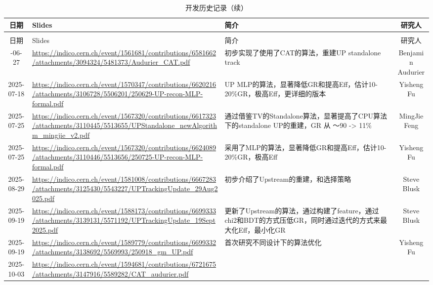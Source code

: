 \documentclass[UTF8]{article}
\begin{document}
\renewcommand{\arraystretch}{1.6}
\begin{longtable}{c>{\centering\arraybackslash}m{4cm}m{6cm}c}
    \caption{开发历史记录}
    \label{tab:research-done} \\
    \toprule
    日期 & Slides & 简介 & 研究人 \\
    \midrule
    \endfirsthead
    \caption{开发历史记录（续）} \\
    \toprule
    日期 & Slides & 简介 & 研究人 \\
    \midrule
    \endhead
    \bottomrule
    \endfoot
    2025-06-27 & \tiny\url{https://indico.cern.ch/event/1561681/contributions/6581662/attachments/3094324/5481373/Audurier_CAT.pdf}
        & 初步实现了使用了CAT的算法，重建UP standalone track
        & Benjamin Audurier \\
    2025-07-18 & \tiny\url{https://indico.cern.ch/event/1570347/contributions/6620216/attachments/3106728/5506201/250629-UP-recon-MLP-formal.pdf}
        & UP MLP的算法，显著降低GR和提高Eff，估计10-20\%GR，极高Eff，更详细的版本
        & Yisheng Fu \\
    2025-07-25 & \tiny\url{https://indico.cern.ch/event/1567320/contributions/6617323/attachments/3110445/5513655/UPStandalone_newAlgorithm_mingjie_v2.pdf}
        & 通过借鉴TV的Standalone算法，显著提高了CPU算法下的standalone UP的重建，GR 从 ～90 -> 11\%
        & MingJie Feng \\
    2025-07-25 & \tiny\url{https://indico.cern.ch/event/1567320/contributions/6624089/attachments/3110446/5513656/250725-UP-recon-MLP-formal.pdf}
        & 采用了MLP的算法，显著降低GR和提高Eff，估计10-20\%GR，极高Eff
        & Yisheng Fu \\
    2025-08-29 & \tiny\url{https://indico.cern.ch/event/1581008/contributions/6667283/attachments/3125430/5543227/UPTrackingUpdate_29Aug2025.pdf}
        & 初步介绍了Upstream的重建，和选择策略
        & Steve Blusk \\
    2025-09-19 & \tiny\url{https://indico.cern.ch/event/1588173/contributions/6699333/attachments/3139131/5571192/UPTrackingUpdate_19Sept2025.pdf}
        & 更新了Upstream的算法，通过构建了feature，通过chi2和BDT的方式压低GR，同时通过迭代的方式来最大化Eff，最小化GR
        & Steve Blusk \\
    2025-09-19 & \tiny\url{https://indico.cern.ch/event/1589779/contributions/6699332/attachments/3138692/5569993/250918_gm_UP.pdf}
        & 首次研究不同设计下的算法优化
        & Yisheng Fu \\
    2025-10-03 & \tiny\url{https://indico.cern.ch/event/1594681/contributions/6721675/attachments/3147916/5589282/CAT_audurier.pdf}

\end{longtable}
\end{document}
